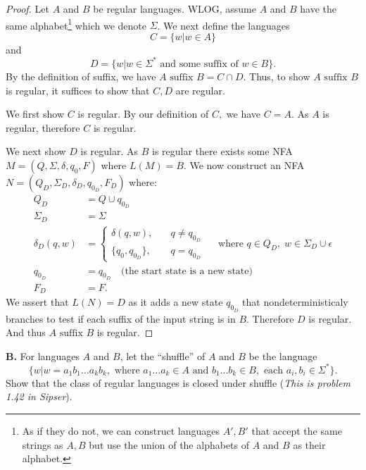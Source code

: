 \documentclass[10pt]{article}
\begin{document}
\begin{proof}



    Let $A$ and $B$ be regular languages.
    WLOG, assume $A$ and $B$ have the same alphabet\footnote{As if they do not, we can construct languages $A',B'$ that accept the same strings as $A,B$ but use the union of the alphabets of $A$ and $B$ as their alphabet.} which we denote $\Sigma$.
    We next define the languages
    \[C =\{w|w\in A\}\]
    and
    \[D=\{w|w\in\Sigma^*\text{ and some suffix of }w\in B\}.\]
    By the definition of suffix, we have $A\text{ suffix }B=C\cap D.$ Thus, to show $A\text{ suffix } B$ is regular, it suffices to show that $C,D$ are regular.
    
    We first show $C$ is regular. By our definition of $C,$ we have $C=A.$ As $A$ is regular, therefore $C$ is regular.
    
    We next show $D$ is regular. As $B$ is regular there exists some NFA $M=(Q,\Sigma,\delta,q_0,F)$ where $L(M)=B.$
    We now construct an NFA $N=(Q_D,\Sigma_D,\delta_D,q_{0_D},F_D)$ where:
    \begin{align*}
        Q_D &= Q \cup q_{0_D}\\
        \Sigma_D &= \Sigma\\
        \delta_D(q,w)&=\begin{cases}
            \delta(q,w),\quad& q\neq q_{0_D}\\
            \{q_0, q_{0_D}\} ,\quad& q= q_{0_D}
        \end{cases}\quad\text{ where }q\in Q_D,\;
         w\in\Sigma_D\cup\epsilon\\
        q_{0_D} &= q_{0_D}\quad\text{(the start state is a new state)}\\
        F_D &= F.
    \end{align*}
    We assert that $L(N)=D$ as it adds a new state $q_{0_D}$ that nondeterministicaly branches to test if each suffix of the input string is in $B$.
    Therefore $D$ is regular. And thus $A\text{ suffix } B$ is regular.
\end{proof}

\newpage

\noindent
\textbf{B.} For languages $A$ and $B$, let the ``shuffle'' of $A$ and $B$ be the language
\[\{w|w=a_1b_1...a_kb_k,\text{ where }a_1...a_k\in A\text{ and }b_1...b_k\in B, \text{ each }a_i,b_i\in\Sigma^*\}.\]
Show that the class of regular languages is closed under shuffle (\textit{This is problem 1.42 in Sipser}).\\
\end{document}
